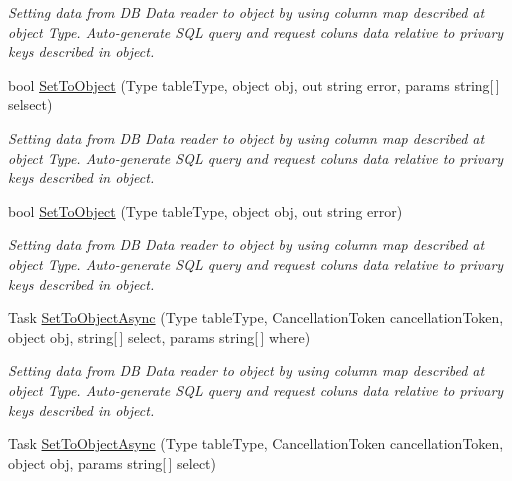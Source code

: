 \begin{DoxyCompactItemize}
\begin{DoxyCompactList}\small\item\em Setting data from DB Data reader to object by using column map described at object Type. Auto-\/generate S\+QL query and request coluns data relative to privary keys described in object. \end{DoxyCompactList}\item 
bool \mbox{\hyperlink{interface_uniform_data_operator_1_1_sql_1_1_i_sql_operator_ae1053edf9aa3d9385ef3591e7ee863c7}{Set\+To\+Object}} (Type table\+Type, object obj, out string error, params string\mbox{[}$\,$\mbox{]} selsect)
\begin{DoxyCompactList}\small\item\em Setting data from DB Data reader to object by using column map described at object Type. Auto-\/generate S\+QL query and request coluns data relative to privary keys described in object. \end{DoxyCompactList}\item 
bool \mbox{\hyperlink{interface_uniform_data_operator_1_1_sql_1_1_i_sql_operator_ac170526dd0fa31f2848ece5f5c5bb9d7}{Set\+To\+Object}} (Type table\+Type, object obj, out string error)
\begin{DoxyCompactList}\small\item\em Setting data from DB Data reader to object by using column map described at object Type. Auto-\/generate S\+QL query and request coluns data relative to privary keys described in object. \end{DoxyCompactList}\item 
Task \mbox{\hyperlink{interface_uniform_data_operator_1_1_sql_1_1_i_sql_operator_a16e1513f43f3b9d76c687ba3b026573d}{Set\+To\+Object\+Async}} (Type table\+Type, Cancellation\+Token cancellation\+Token, object obj, string\mbox{[}$\,$\mbox{]} select, params string\mbox{[}$\,$\mbox{]} where)
\begin{DoxyCompactList}\small\item\em Setting data from DB Data reader to object by using column map described at object Type. Auto-\/generate S\+QL query and request coluns data relative to privary keys described in object. \end{DoxyCompactList}\item 
Task \mbox{\hyperlink{interface_uniform_data_operator_1_1_sql_1_1_i_sql_operator_a3a973b49f190dabe6bcd0bf3e79b3c5e}{Set\+To\+Object\+Async}} (Type table\+Type, Cancellation\+Token cancellation\+Token, object obj, params string\mbox{[}$\,$\mbox{]} select)

\end{DoxyCompactItemize}
